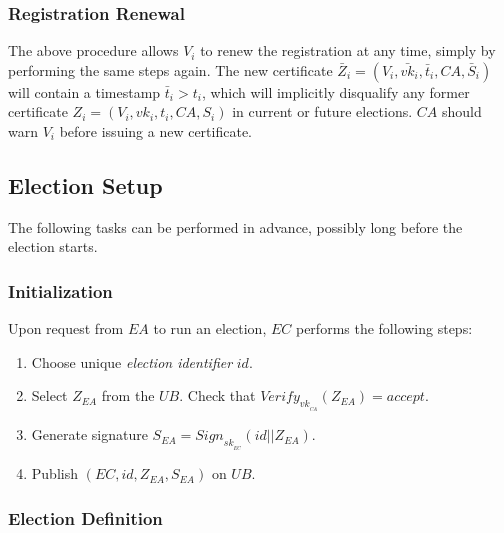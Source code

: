\documentclass[bibtotoc,halfparskip,oneside]{scrreprt}
\newcommand{\eid}{\mathit{id}\xspace}
\newcommand{\sk}[1]{\mathit{sk}_{#1}\xspace}
\newcommand{\vk}[1]{\mathit{vk}_{#1}\xspace}
\newcommand{\vkbar}[1]{\bar{\mathit{vk}}_{#1}\xspace}
\newcommand{\SK}[1]{\sk{_#1}\xspace}
\newcommand{\VK}[1]{\vk{_#1}\xspace}
\newcommand{\CA}{\ensuremath{\mathit{CA}}\xspace}
\newcommand{\EA}{\ensuremath{\mathit{EA}}\xspace}
\newcommand{\EC}{\ensuremath{\mathit{EC}}\xspace}
\newcommand{\UB}{\ensuremath{\mathit{UB}}\xspace}
\newcommand{\Voter}[1]{\ensuremath{\mathit{V}_{#1}}\xspace}
\begin{document}
\subsubsection{Registration Renewal}
The above procedure allows $\Voter{i}$ to renew the registration at any time, simply by performing the same steps again. The new certificate $\bar{Z}_i=(\Voter{i},\vkbar{i},\bar{t}_i,\CA,\bar{S}_i)$ will contain a timestamp $\bar{t}_i>t_i$, which will implicitly disqualify any former certificate $Z_i=(\Voter{i},\vk{i},t_i,\CA,S_i)$ in current or future elections. \CA should warn $\Voter{i}$ before issuing a new certificate.

\subsection{Election Setup}

The following tasks can be performed in advance, possibly long before the election starts.

\subsubsection{Initialization}

Upon request from \EA to run an election, \EC performs the following steps: 
\begin{enumerate}
	\item Choose unique \emph{election identifier} $\eid$.
	\item Select $Z_{\EA}$ from the \UB. Check that $\mathit{Verify}_{\VK{\CA}}(Z_{\EA})=\mathit{accept}$.
	\item Generate signature $S_{\EA}=\mathit{Sign}_{\SK{\EC}}(\eid||Z_{\EA})$. 
	\item Publish $(\EC,\eid,Z_{\EA},S_{\EA})$ on \UB.
\end{enumerate}


\subsubsection{Election Definition}
\end{document}
